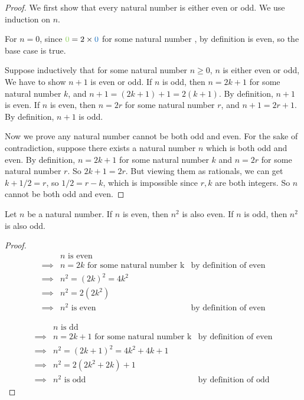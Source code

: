 \begin{proof}
We first show that every natural number is either even or odd.
We use induction on \(n\).

For \(n = 0\), since \(\GREEN{0} = 2 \X \BLUE{0}\) for some natural number , by definition  is even, so the base case is true.

Suppose inductively that for some natural number \(n \ge 0\), \(n\) is either even or odd, We have to show \(n + 1\) is even or odd.
If \(n\) is odd, then \(n = 2k + 1\) for some natural number \(k\), and \(n + 1 = (2k + 1) + 1 = 2(k +1)\).
By definition, \(n + 1\) is even.
If \(n\) is even, then \(n = 2r\) for some natural number \(r\), and \(n + 1 = 2r + 1\).
By definition, \(n + 1\) is odd.

Now we prove any natural number cannot be both odd and even.
For the sake of contradiction, suppose there exists a natural number \(n\) which is both odd and even.
By definition, \(n = 2k + 1\) for some natural number \(k\) and \(n = 2r\) for some natural number \(r\).
So \(2k + 1 = 2r\).
But viewing them as rationals, we can get \(k + 1/2 = r\), so \(1/2 = r - k\), which is impossible since \(r, k\) are both integers.
So \(n\) cannot be both odd and even.
\end{proof}

\begin{additional corollary} \label{ac 4.4.2}
Let \(n\) be a natural number.
If \(n\) is even, then \(n^2\) is also even.
If \(n\) is odd, then \(n^2\) is also odd.
\end{additional corollary}

\begin{proof}
\begin{align*}
             & n \text{ is even} \\
    \implies & n = 2k \text{ for some natural number k} & \text{by definition of even} \\
    \implies & n^2 = (2k)^2 = 4k^2 \\
    \implies & n^2 = 2(2k^2) \\
    \implies & n^2 \text{ is even} & \text{by definition of even}
\end{align*}

\begin{align*}
             & n \text{ is dd} \\
    \implies & n = 2k + 1 \text{ for some natural number k} & \text{by definition of even} \\
    \implies & n^2 = (2k + 1)^2 = 4k^2 + 4k + 1 \\
    \implies & n^2 = 2(2k^2 + 2k) + 1 \\
    \implies & n^2 \text{ is odd} & \text{by definition of odd}
\end{align*}
\end{proof}

